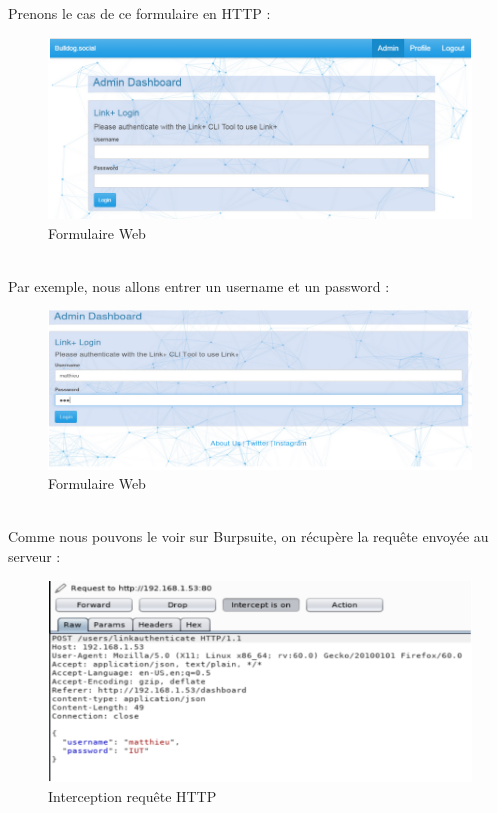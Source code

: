 \newpage
 Prenons le cas de ce formulaire en HTTP :
\begin{figure}[htp!]
  \centering
  \setlength\figureheight{7cm}
  \setlength\figurewidth{9cm}
  \includegraphics[width=1\textwidth]{oui/Ancien/imangeancien/burpsuite/burpsuite4.PNG}
  \caption{Formulaire Web}
  \label{fig:courbe-tikz}
\end{figure}\\
 Par exemple, nous allons entrer un username et un password :
\begin{figure}[htp!]
  \centering
  \setlength\figureheight{7cm}
  \setlength\figurewidth{9cm}
  \includegraphics[width=1\textwidth]{oui/Ancien/imangeancien/burpsuite/burpsuite5.PNG}
  \caption{Formulaire Web}
  \label{fig:courbe-tikz}
\end{figure}\\
Comme nous pouvons le voir sur Burpsuite, on récupère la requête envoyée au serveur :
\newpage
\begin{figure}[htp!]
  \centering
  \setlength\figureheight{7cm}
  \setlength\figurewidth{9cm}
  \includegraphics[width=1\textwidth]{oui/Ancien/imangeancien/burpsuite/burpsuite6.PNG}
  \caption{Interception requête HTTP}
  \label{fig:courbe-tikz}
\end{figure}

